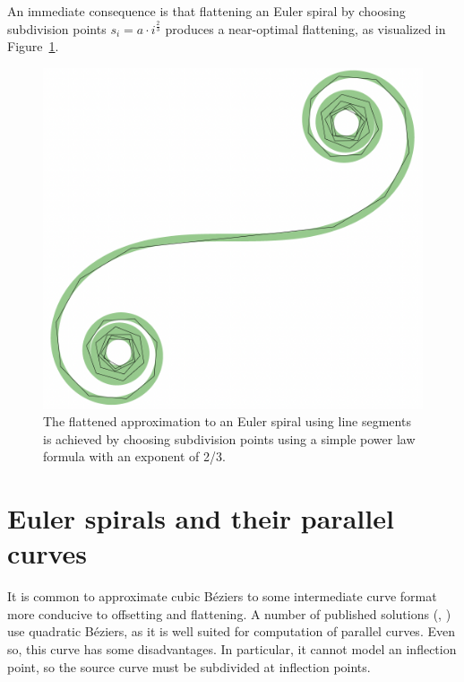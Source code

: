 \documentclass[sigconf, nonacm]{acmart}
\begin{document}
An immediate consequence is that flattening an Euler spiral by choosing subdivision points $s_i = a\cdot i^\frac{2}{3}$ produces a near-optimal flattening, as visualized in Figure~\ref{fig:es_flatten}.

\begin{figure}
    \includegraphics[scale=0.3]{es_flatten}
    \caption{The flattened approximation to an Euler spiral using line segments is achieved by choosing subdivision points using a simple power law formula with an exponent of 2/3.}
    \label{fig:es_flatten}
\end{figure}


\section{Euler spirals and their parallel curves}

It is common to approximate cubic Béziers to some intermediate curve format more conducive to offsetting and flattening. A number of published solutions (\citet{Yzerman2020}, \citet{Nehab2020}) use quadratic Béziers, as it is well suited for computation of parallel curves. Even so, this curve has some disadvantages. In particular, it cannot model an inflection point, so the source curve must be subdivided at inflection points.
\end{document}
